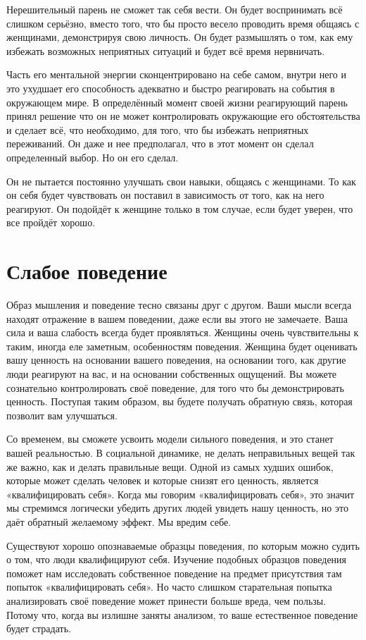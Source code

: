 Нерешительный парень не сможет так себя вести. Он будет воспринимать всё слишком серьёзно, вместо того, что бы просто весело проводить время общаясь с женщинами, демонстрируя свою личность. Он будет размышлять о том, как ему избежать возможных неприятных ситуаций и будет всё время нервничать.

Часть его ментальной энергии сконцентрировано на себе самом, внутри него и это ухудшает его способность адекватно и быстро реагировать на события в окружающем мире. В определённый момент своей жизни реагирующий парень принял решение что он не может контролировать окружающие его обстоятельства и сделает всё, что необходимо, для того, что бы избежать неприятных переживаний. Он даже и нее предполагал, что в этот момент он сделал определенный выбор. Но он его сделал.

Он не пытается постоянно улучшать свои навыки, общаясь с женщинами. То как он себя будет чувствовать он поставил в зависимость от того, как на него реагируют. Он подойдёт к женщине только в том случае, если будет уверен, что все пройдёт хорошо.

\chapter{Слабое поведение}

Образ мышления и поведение тесно связаны друг с другом. Ваши мысли всегда находят отражение в вашем поведении, даже если вы этого не замечаете. Ваша сила и ваша слабость всегда будет проявляться. Женщины очень чувствительны к таким, иногда еле заметным, особенностям поведения. Женщина будет оценивать вашу ценность на основании вашего поведения, на основании того, как другие люди реагируют на вас, и на основании собственных ощущений. Вы можете сознательно контролировать своё поведение, для того что бы демонстрировать ценность. Поступая таким образом, вы будете получать обратную связь, которая позволит вам улучшаться.

Со временем, вы сможете усвоить модели сильного поведения, и это станет вашей реальностью. В социальной динамике, не делать неправильных вещей так же важно, как и делать правильные вещи. Одной из самых худших ошибок, которые может сделать человек и которые снизят его ценность, является «квалифицировать себя». Когда мы говорим «квалифицировать себя», это значит мы стремимся логически убедить других людей увидеть нашу ценность, но это даёт обратный желаемому эффект. Мы вредим себе.

Существуют хорошо опознаваемые образцы поведения, по которым можно судить о том, что люди квалифицируют себя. Изучение подобных образцов поведения поможет нам исследовать собственное поведение на предмет присутствия там попыток «квалифицировать себя». Но часто слишком старательная попытка анализировать своё поведение может принести больше вреда, чем пользы. Потому что, когда вы излишне заняты анализом, то ваше естественное поведение будет страдать.

